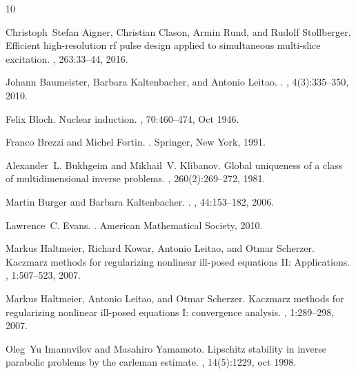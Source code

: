 \documentclass{ws-m3as}
\begin{document}
%
%
\begin{thebibliography}{10}

Christoph~Stefan Aigner, Christian Clason, Armin Rund, and Rudolf Stollberger.
\newblock Efficient high-resolution rf pulse design applied to simultaneous
  multi-slice excitation.
, 263:33--44, 2016.

Johann Baumeister, Barbara Kaltenbacher, and Antonio Leitao.
.
, 4(3):335--350, 2010.

Felix Bloch.
\newblock Nuclear induction.
, 70:460--474, Oct 1946.

Franco Brezzi and Michel Fortin.
.
\newblock Springer, New York, 1991.

Alexander~L. Bukhgeim and Mikhail~V. Klibanov.
\newblock Global uniqueness of a class of multidimensional inverse problems.
, 260(2):269--272, 1981.

Martin Burger and Barbara Kaltenbacher.
.
, 44:153--182, 2006.

Lawrence~C. Evans.
.
\newblock American Mathematical Society, 2010.

Markus Haltmeier, Richard Kowar, Antonio Leitao, and Otmar Scherzer.
\newblock Kaczmarz methods for regularizing nonlinear ill-posed equations {II}:
  Applications.
, 1:507--523, 2007.

Markus Haltmeier, Antonio Leitao, and Otmar Scherzer.
\newblock Kaczmarz methods for regularizing nonlinear ill-posed equations {I}:
  convergence analysis.
, 1:289--298, 2007.

Oleg~Yu Imanuvilov and Masahiro Yamamoto.
\newblock Lipschitz stability in inverse parabolic problems by the carleman
  estimate.
, 14(5):1229, oct 1998.


\end{thebibliography}
\end{document}
